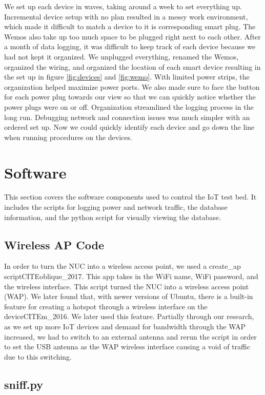 We set up each device in waves, taking around a week to set everything up. Incremental device setup with no plan resulted in a messy work environment, which made it difficult to match a device to it is corresponding smart plug. The Wemos also take up too much space to be plugged right next to each other. After a month of data logging, it was difficult to keep track of each device because we had not kept it organized. We unplugged everything, renamed the Wemos, organized the wiring, and organized the location of each smart device resulting in the set up in figure \ref{fig:devices} and \ref{fig:wemo}. With limited power strips, the organization helped maximize power ports. We also made sure to face the button for each power plug towards our view so that we can quickly notice whether the power plugs were on or off. Organization streamlined the logging process in the long run. Debugging network and connection issues was much simpler with an ordered set up. Now we could quickly identify each device and go down the line when running procedures on the devices.

\section{Software}
\label{software}
This section covers the software components used to control the IoT test bed. It includes the scripts for logging power and network traffic, the database information, and the python script for visually viewing the database.

\subsection{Wireless AP Code}
In order to turn the NUC into a wireless access point, we used a create\_ap script\cite{guest_2018}CITEoblique\_2017. This app takes in the WiFi name, WiFi password, and the wireless interface. This script turned the NUC into a wireless access point (WAP). We later found that, with newer versions of Ubuntu, there is a built-in feature for creating a hotspot through a wireless interface on the device\cite{guest_2018}CITEm\_2016. We later used this feature. Partially through our research, as we set up more IoT devices and demand for bandwidth through the WAP increased, we had to switch to an external antenna and rerun the script in order to set the USB antenna as the WAP wireless interface causing a void of traffic due to this switching.

\subsection{sniff.py}
\label{sniff.py}

